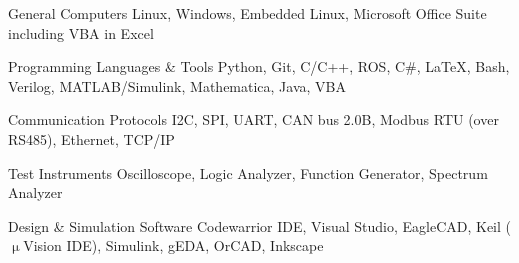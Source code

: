 

\begin{cvskills}

  \cvskill
    {General Computers} %
    {Linux, Windows, Embedded Linux, Microsoft Office Suite including VBA in Excel} %

  \cvskill
    {Programming Languages \& Tools} %
    {Python, Git, C/C++, ROS, C\#, LaTeX, Bash, Verilog, MATLAB/Simulink, Mathematica, Java, VBA} %

  \cvskill
    {Communication Protocols} %
    {I2C, SPI, UART, CAN bus 2.0B, Modbus RTU (over RS485), Ethernet, TCP/IP} %

  \cvskill
    {Test Instruments} %
    {Oscilloscope, Logic Analyzer, Function Generator, Spectrum Analyzer} %

  \cvskill
    {Design \& Simulation Software} %
    {Codewarrior IDE, Visual Studio, EagleCAD, Keil ($\upmu$Vision IDE), Simulink, gEDA, OrCAD, Inkscape} %

\end{cvskills}
